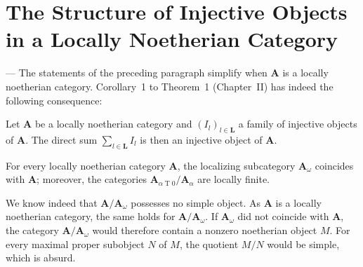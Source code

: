 %
%
%

\section{The Structure of Injective Objects in a Locally Noetherian Category}

--- The statements of the preceding paragraph simplify when
$\mathbf{A}$ is a locally noetherian category. Corollary~1 to
Theorem~1 (Chapter~II) has indeed the following consequence:

\begin{proposition}
Let $\mathbf{A}$ be a locally noetherian category and
$(I_l)_{l\in\mathbf{L}}$ a family of injective objects of
$\mathbf{A}$. The direct sum $\sum_{l\in\mathbf{L}} I_l$ is then an
injective object of $\mathbf{A}$.
\end{proposition}

\begin{proposition}
For every locally noetherian category $\mathbf{A}$, the localizing
subcategory $\mathbf{A}_\omega$ coincides with $\mathbf{A}$; moreover,
the categories
$\mathbf{A}_{\alpha \mathbin{T} 0}/\mathbf{A}_\alpha$ are locally
finite.
\end{proposition}

We know indeed that $\mathbf{A}/\mathbf{A}_\omega$ possesses no simple
object. As $\mathbf{A}$ is a locally noetherian category, the same
holds for $\mathbf{A}/\mathbf{A}_\omega$. If $\mathbf{A}_\omega$ did
not coincide with $\mathbf{A}$, the category
$\mathbf{A}/\mathbf{A}_\omega$ would therefore contain a nonzero
noetherian object $M$. For every maximal proper subobject $N$ of $M$,
the quotient $M/N$ would be simple, which is absurd.


